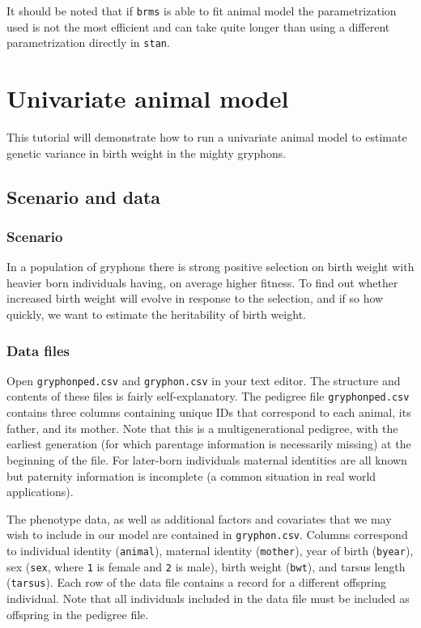 \documentclass[
  12pt,
]{book}
\begin{document}
It should be noted that if \texttt{brms} is able to fit animal model the parametrization used is not the most efficient and can take quite longer than using a different parametrization directly in \texttt{stan}.

\hypertarget{univariate-animal-model}{%
\chapter{Univariate animal model}\label{univariate-animal-model}}

This tutorial will demonstrate how to run a univariate animal model to estimate genetic variance in birth weight in the mighty gryphons.

\hypertarget{scenario-and-data}{%
\section{Scenario and data}\label{scenario-and-data}}

\hypertarget{scenario}{%
\subsection{Scenario}\label{scenario}}

In a population of gryphons there is strong positive selection on birth weight with heavier born individuals having, on average higher fitness. To find out whether increased birth weight will evolve in response to the selection, and if so how quickly, we want to estimate the heritability of birth weight.

\hypertarget{data-files-1}{%
\subsection{Data files}\label{data-files-1}}

Open \texttt{gryphonped.csv} and \texttt{gryphon.csv} in your text editor. The structure and contents of these files is fairly self-explanatory. The pedigree file \texttt{gryphonped.csv} contains three columns containing unique IDs that correspond to each animal, its father, and its mother. Note that this is a multigenerational pedigree, with the earliest generation (for which parentage information is necessarily missing) at the beginning of the file. For later-born individuals maternal identities are all known but paternity information is incomplete (a common situation in real world applications).

The phenotype data, as well as additional factors and covariates that we may wish to include in our model are contained in \texttt{gryphon.csv}. Columns correspond to individual identity (\texttt{animal}), maternal identity (\texttt{mother}), year of birth (\texttt{byear}), sex (\texttt{sex}, where \texttt{1} is female and \texttt{2} is male), birth weight (\texttt{bwt}), and tarsus length (\texttt{tarsus}). Each row of the data file contains a record for a different offspring individual. Note that all individuals included in the data file must be included as offspring in the pedigree file.
\end{document}
